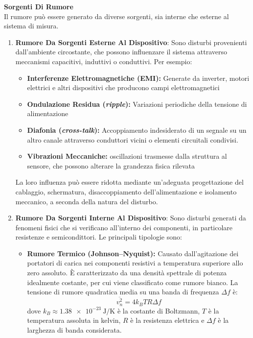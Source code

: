 ﻿\documentclass[11pt, a4paper]{article}
\begin{document}
\newpage
\textbf{Sorgenti Di Rumore}\\
Il rumore può essere generato da diverse sorgenti, sia interne che esterne al sistema di misura.
\begin{enumerate}
    \item \textbf{Rumore Da Sorgenti Esterne Al Dispositivo}: Sono disturbi provenienti dall'ambiente circostante, che possono influenzare il sistema attraverso meccanismi capacitivi, induttivi o conduttivi. Per esempio:
    \begin{itemize}
        \item \textbf{Interferenze Elettromagnetiche (EMI):} Generate da inverter, motori elettrici e altri dispositivi che producono campi elettromagnetici
        \item \textbf{Ondulazione Residua (\textit{ripple}):} Variazioni periodiche della tensione di alimentazione
        \item \textbf{Diafonia (\textit{cross-talk}):} Accoppiamento indesiderato di un segnale su un altro canale attraverso conduttori vicini o elementi circuitali condivisi.
        \item \textbf{Vibrazioni Meccaniche:} oscillazioni trasmesse dalla struttura al sensore, che possono alterare la grandezza fisica rilevata
    \end{itemize}
    La loro influenza può essere ridotta mediante un'adeguata progettazione del cablaggio, schermatura, disaccoppiamento dell'alimentazione e isolamento meccanico, a seconda della natura del disturbo.

    \item \textbf{Rumore Da Sorgenti Interne Al Dispositivo}: Sono disturbi generati da fenomeni fisici che si verificano all'interno dei componenti, in particolare resistenze e semicondittori. Le principali tipologie sono:
    \begin{itemize}
        \item \textbf{Rumore Termico (Johnson--Nyquist):} Causato dall'agitazione dei portatori di carica nei componenti resistivi a temperatura superiore allo zero assoluto. È caratterizzato da una densità spettrale di potenza idealmente costante, per cui viene classificato come rumore bianco. La tensione di rumore quadratica media su una banda di frequenza $\Delta f$ è:
        \[
            \overline{v_n^2} = 4 k_B T R \Delta f
        \]
        dove $k_B \approx \SI{1.38e-23}{\joule\per\kelvin}$ è la costante di Boltzmann, $T$ è la temperatura assoluta in kelvin, $R$ è la resistenza elettrica e $\Delta f$ è la larghezza di banda considerata.


\end{itemize}
\end{enumerate}
\end{document}
